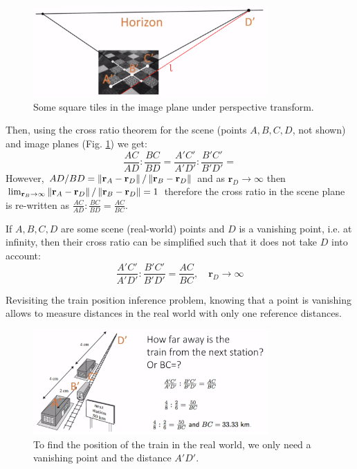 \documentclass[a4paper]{article}
\begin{document}
\begin{figure}[H]
    \centering
    \includegraphics[height=3.5cm]{img/tiles_horizon.png}
    \caption{Some square tiles in the image plane under perspective transform.}
    \label{fig:tiles_perspective}
\end{figure}

Then, using the cross ratio theorem for the scene (points $A,B,C,D$, not shown) and image planes (Fig. \ref{fig:tiles_perspective}) we get:
\[
\frac{AC}{AD}:\frac{BC}{BD}  = \frac{A'C'}{A'D'}:\frac{B'C'}{B'D'} = 
\]
However, $AD/BD = \left\lVert\textbf{r}_A - \textbf{r}_D\right\rVert/\left\lVert\textbf{r}_B - \textbf{r}_D\right\rVert$ and as $\textbf{r}_D \rightarrow \infty$ then $\lim_{\textbf{r}_B\rightarrow \infty} \left\lVert\textbf{r}_A - \textbf{r}_D\right\rVert/\left\lVert\textbf{r}_B - \textbf{r}_D\right\rVert = 1$ therefore the cross ratio in the scene plane is re-written as $\frac{AC}{AD}:\frac{BC}{BD} = \frac{AC}{BC}$.
\begin{corollary}
If $A,B,C,D$ are some scene (real-world) points and $D$ is a vanishing point, i.e. at infinity, then their cross ratio can be simplified such that it does not take $D$ into account:
\begin{equation}
    \frac{A'C'}{A'D'}:\frac{B'C'}{B'D'} = \frac{AC}{BC}, \quad \textbf{r}_D\rightarrow \infty
    \label{eq:cross_ratio_vanishing_point}
\end{equation}
\end{corollary}
Revisiting the train position inference problem, knowing that a point is vanishing allows to measure distances in the real world with only one reference distances.
\begin{figure}[H]
    \centering
    \includegraphics[height=4cm]{img/train_metrology_vanishing_point.png}
    \caption{To find the position of the train in the real world, we only need a vanishing point and the distance $A'D'$.}
\end{figure}
\end{document}
